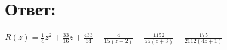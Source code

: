 \documentclass[12pt, a4paper]{article}
\begin{document}
    \section*{Ответ:}
    \begin{math}
        R(z) = \frac{1}{4}z^2 + \frac{33}{16}z + \frac{433}{64} -
        \frac{4}{15(z-2)} - \frac{1152}{55(z + 3)} + \frac{175}{2112(4z + 1)}
    \end{math}
\end{document}
